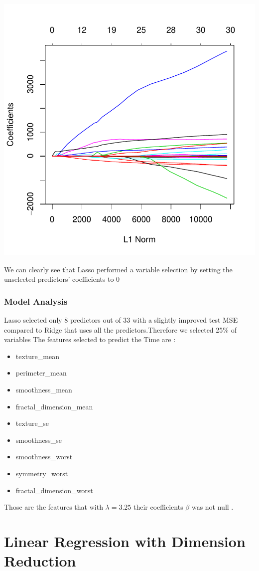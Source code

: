 \documentclass[]{report}
\begin{document}
\begin{center}
	\includegraphics[width=0.8\linewidth]{Figures/lasso_coeff}
\end{center}
We can clearly see that Lasso performed a variable selection by setting the unselected predictors' coefficients to 0

\subsubsection{Model Analysis}
 Lasso selected only 8 predictors out of 33 with a slightly improved test MSE compared to Ridge that uses all the predictors.Therefore we selected 25\% of variables The features selected to predict the Time are :
 \begin{itemize} 
 \item texture\_mean
 \item perimeter\_mean
 \item smoothness\_mean
 \item fractal\_dimension\_mean
 \item texture\_se
 \item smoothness\_se
 \item smoothness\_worst
 \item symmetry\_worst
 \item fractal\_dimension\_worst
\end{itemize}
Those are the features that with $\lambda = 3.25 $ their coefficients $\beta$ was not null .
\section{Linear Regression with Dimension Reduction}
\end{document}
